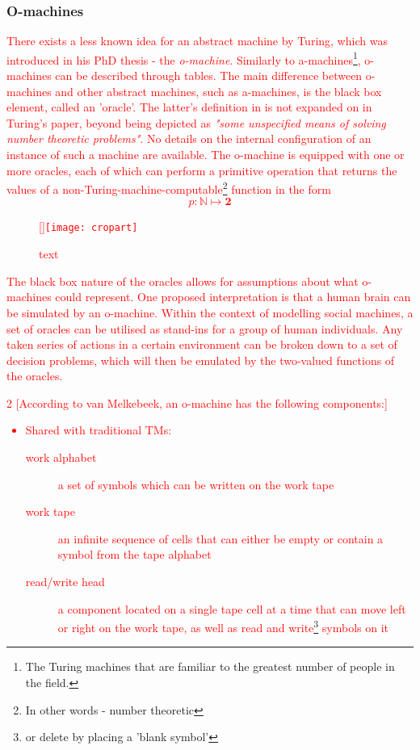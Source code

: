 \documentclass[12pt,a4,xcolor=table]{article}
\begin{document}
	\subsubsection{O-machines}
	\textcolor{red}{
	There exists a less known idea for an abstract machine by Turing, which was introduced in his PhD thesis - the \textit{o-machine}. Similarly to a-machines\footnote{The Turing machines that are familiar to the greatest number of people in the field.}, o-machines can be described through tables. The main difference between o-machines and other abstract machines, such as a-machines, is the black box element, called an 'oracle'. The latter's definition in is not expanded on in Turing's paper, beyond being depicted as \textit{"some unspecified means of solving number theoretic problems"}\cite{Turing1938}. No details on the internal configuration of an instance of such a machine are available. The o-machine is equipped with one or more oracles, each of which can perform a primitive operation that returns the values of a non-Turing-machine-computable\footnote{In other words - number theoretic} function\cite{Copeland1998} in the form \[ p:\mathbb{N}\mapsto \mathbf{2} \]
	\begin{figure}
		\centering
		\raisebox{0pt}[\dimexpr{}\baselineskip\relax]{\texttt{[image: cropart]}}%
		\caption[short text]{text}
	\end{figure}
	The black box nature of the oracles allows for assumptions about what o-machines could represent. One proposed interpretation is that a human brain can be simulated by an o-machine\cite{Copeland1998}. Within the context of modelling social machines, a set of oracles can be utilised as stand-ins for a group of human individuals. Any taken series of actions in a certain environment can be broken down to a set of decision problems, which will then be emulated by the two-valued functions of the oracles.
	\clearpage
	\begin{multicols}{2}
		[According to van Melkebeek\cite{Melkebeek}, an o-machine has the following components:]
		\begin{itemize}
			\item Shared with traditional TMs:
			\begin{description}
				\item[work alphabet] a set of symbols which can be written on the work tape
				\item[work tape] an infinite sequence of cells that can either be empty or contain a symbol from the tape alphabet
				\item[read/write head] a component located on a single tape cell at a time that can move left or right on the work tape, as well as read and write\footnote{or delete by placing a 'blank symbol'} symbols on it

\end{description}
\end{itemize}
\end{multicols}}
\end{document}
